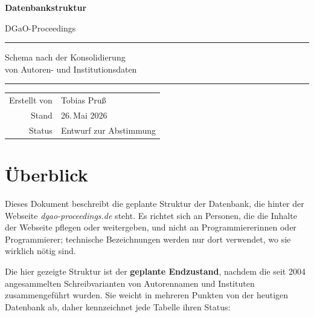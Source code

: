 \documentclass[11pt,a4paper,parskip=half-]{scrartcl}
\begin{document}
\begin{titlepage}
  \centering
  \vspace*{2.5cm}
  {\sffamily\Huge\bfseries\color{accent} Datenbankstruktur\par}
  \vspace{0.4cm}
  {\sffamily\Large DGaO-Proceedings\par}
  \vspace{1.6cm}
  {\color{rulecolor}\rule{0.45\linewidth}{0.6pt}\par}
  \vspace{0.6cm}
  {\sffamily\large Schema nach der Konsolidierung\\[0.15cm]
   \normalsize von Autoren- und Institutionsdaten\par}
  \vspace{0.6cm}
  {\color{rulecolor}\rule{0.45\linewidth}{0.6pt}\par}
  \vfill
  \begin{tabular}{rl}
    \sffamily Erstellt von & Tobias Pruß \\
    \sffamily Stand        & 26.\,Mai 2026 \\
    \sffamily Status       & Entwurf zur Abstimmung \\
  \end{tabular}
  \vspace{1.5cm}
\end{titlepage}

\tableofcontents
\vspace{1.2em}

\section{Überblick}

Dieses Dokument beschreibt die geplante Struktur der Datenbank,
die hinter der Webseite \emph{dgao-proceedings.de} steht. Es richtet sich an
Personen, die die Inhalte der Webseite pflegen oder weitergeben, und nicht
an Programmiererinnen oder Programmierer; technische Bezeichnungen werden
nur dort verwendet, wo sie wirklich nötig sind.

Die hier gezeigte Struktur ist der \textbf{geplante Endzustand}, nachdem die
seit 2004 angesammelten Schreibvarianten von Autorennamen und Instituten
zusammengeführt wurden. Sie weicht in mehreren Punkten von der heutigen
Datenbank ab, daher kennzeichnet jede Tabelle ihren Status:
\end{document}
